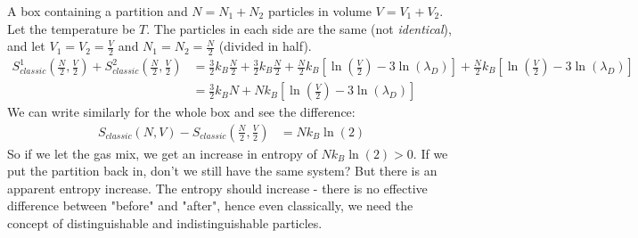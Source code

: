 \documentclass[a4paper, 11pt, normalem]{report}
\begin{document}
\begin{example}
    A box containing a partition and $N = N_1 + N_2$ particles in volume $V = V_1 + V_2$. 
    Let the temperature be $T$. 
    The particles in each side are the same (not \emph{identical}), and let $V_1 = V_2 = \frac{V}{2}$ and $N_1 = N_2 = \frac{N}{2}$ (divided in half).
    \begin{align}
        S^1_{classic}\left(\frac{N}{2},\frac{V}{2}\right) + S^2_{classic}\left(\frac{N}{2},\frac{V}{2}\right) &= \frac{3}{2}k_B\frac{N}{2} + \frac{3}{2}k_B\frac{N}{2} + \frac{N}{2}k_B\left[\ln\left(\frac{V}{2}\right) - 3\ln(\lambda_D)\right] + \frac{N}{2}k_B\left[\ln\left(\frac{V}{2}\right) - 3\ln(\lambda_D)\right] \\
                                                                                                              &= \frac{3}{2}k_BN + Nk_B\left[\ln\left(\frac{V}{2}\right) - 3\ln(\lambda_D)\right]
    \end{align}
    We can write similarly for the whole box and see the difference:
    \begin{align}
        S_{classic}(N,V) - S_{classic}\left(\frac{N}{2},\frac{V}{2}\right) &= Nk_B\ln(2)
    \end{align}
    So if we let the gas mix, we get an increase in entropy of $Nk_B\ln(2) > 0$.
    If we put the partition back in, don't we still have the same system?
    But there is an apparent entropy increase.
    The entropy should  increase - there is no effective difference between "before" and "after", hence even classically, we need the concept of distinguishable and indistinguishable particles.
\end{example}
\end{document}
